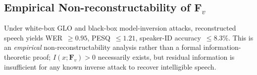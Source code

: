 \documentclass[final,5p,times,number]{elsarticle}
\begin{document}
\subsection{Empirical Non-reconstructability of $\bm{F}_v$}\label{app:nonrecon}

Under white-box GLO and black-box model-inversion attacks, reconstructed speech yields WER~$\ge 0.95$, PESQ~$\le 1.21$, speaker-ID accuracy~$\le 8.3\%$. This is an \emph{empirical} non-reconstructability analysis rather than a formal information-theoretic proof; $I(x;\bm{F}_v)>0$ necessarily exists, but residual information is insufficient for any known inverse attack to recover intelligible speech.

\balance



\end{document}
